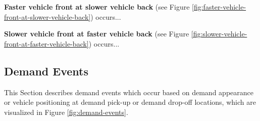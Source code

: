 \documentclass[graybox]{svmult}
\begin{document}
\noindent
\textbf{Faster vehicle front at slower vehicle back} (see Figure \ref{fig:faster-vehicle-front-at-slower-vehicle-back})
occurs...

\vspace{4mm}

\noindent
\textbf{Slower vehicle front at faster vehicle back} (see Figure \ref{fig:slower-vehicle-front-at-faster-vehicle-back})
occurs...


\subsection{Demand Events}
\label{sec:demand-events}
This Section describes demand events which occur based on demand appearance or vehicle positioning at demand pick-up or demand drop-off locations, which are visualized in Figure \ref{fig:demand-events}.
\vspace{4mm}
\end{document}
